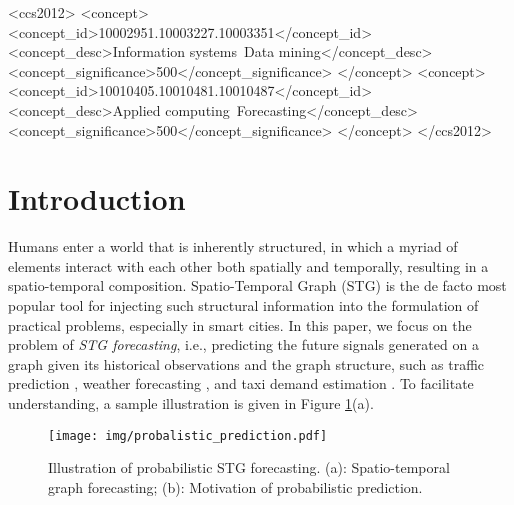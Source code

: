 {	\begin{CCSXML}
		<ccs2012>
		<concept>
		<concept_id>10002951.10003227.10003351</concept_id>
		<concept_desc>Information systems~Data mining</concept_desc>
		<concept_significance>500</concept_significance>
		</concept>
		<concept>
		<concept_id>10010405.10010481.10010487</concept_id>
		<concept_desc>Applied computing~Forecasting</concept_desc>
		<concept_significance>500</concept_significance>
		</concept>
		</ccs2012>
	\end{CCSXML}
	
	
	
	
	\maketitle

 
	

\section{Introduction} \label{introduction}
\par Humans enter a world that is inherently structured, in which a myriad of elements interact with each other both spatially and temporally, resulting in a spatio-temporal composition. Spatio-Temporal Graph (STG) is the de facto most popular tool for injecting such structural information into the formulation of practical problems, especially in smart cities. In this paper, we focus on the problem of \emph{STG forecasting}, i.e.,  predicting the future signals generated on a graph given its historical observations and the graph structure, such as traffic prediction \cite{li2018diffusion}, weather forecasting \cite{simeunovic2021spatio}, and taxi demand estimation \cite{yao2018deep}. To facilitate understanding, a sample illustration is given in Figure \ref{fig:probalistic_prediction}(a).

\begin{figure}[!t]
    \centering
    \texttt{[image: img/probalistic\_prediction.pdf]}
    \caption{Illustration of probabilistic STG forecasting. (a): Spatio-temporal graph forecasting;  (b): Motivation of probabilistic prediction.}
    \label{fig:probalistic_prediction}
    \vspace{-1em}
\end{figure}

}

